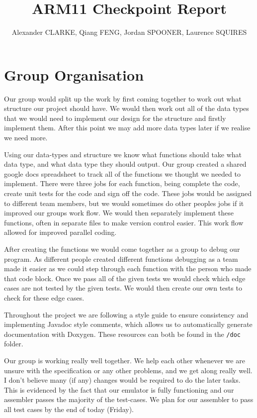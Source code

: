 \documentclass[10pt]{article}
\begin{document}
\title{\vspace{-2cm}ARM11 Checkpoint Report}
\author{\small Alexander CLARKE, Qiang FENG, Jordan SPOONER, Laurence SQUIRES}

\maketitle

\section{Group Organisation}

Our group would split up the work by first coming together to work out what structure our project should have. We would then work out all of the data types that we would need to implement our design for the structure and firstly implement them. After this point we may add more data types later if we realise we need more.

Using our data-types and structure we know what functions should take what data type, and what data type they should output. Our group created a shared google docs spreadsheet to track all of the functions we thought we needed to implement. There were three jobs for each function, being complete the code, create unit tests for the code and sign off the code. These jobs would be assigned to different team members, but we would sometimes do other peoples jobs if it improved our groups work flow. We would then separately implement these functions, often in separate files to make version control easier. This work flow allowed for improved parallel coding.

After creating the functions we would come together as a group to debug our program. As different people created different functions debugging as a team made it easier as we could step through each function with the person who made that code block. Once we pass all of the given tests we would check which edge cases are not tested by the given tests. We would then create our own tests to check for these edge cases.

Throughout the project we are following a style guide to ensure consistency and implementing Javadoc style comments, which allows us to automatically generate documentation with Doxygen. These resources can both be found in the \texttt{/doc} folder.

Our group is working really well together. We help each other whenever we are unsure with the specification or any other problems, and we get along really well. I don’t believe many (if any) changes would be required to do the later tasks. This is evidenced by the fact that our emulator is fully functioning and our assembler passes the majority of the test-cases. We plan for our assembler to pass all test cases by the end of today (Friday).
\end{document}
